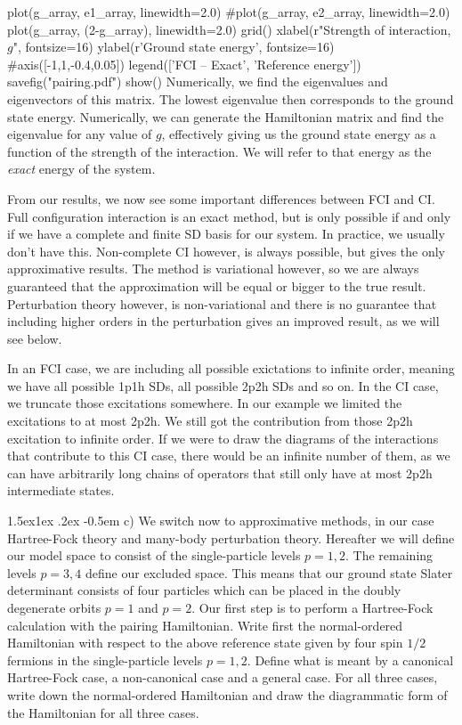 \documentclass[%
twoside,                 %
final,                   %
10pt]{article}
\makeatletter
\newenvironment{doconceexercise}{}{}
\newcommand\subex{\@startsection{paragraph}{4}{\z@}%
                  {1.5ex\@plus1ex \@minus.2ex}%
                  {-0.5em}%
                  {\normalfont\normalsize\bfseries}}
\makeatother
\begin{document}
\begin{doconceexercise}
plot(g_array, e1_array, linewidth=2.0)
#plot(g_array, e2_array, linewidth=2.0)
plot(g_array, (2-g_array), linewidth=2.0)
grid()
xlabel(r"Strength of interaction, $g$", fontsize=16)
ylabel(r'Ground state energy', fontsize=16)
#axis([-1,1,-0.4,0.05])
legend(['FCI -- Exact', 'Reference energy'])
savefig("pairing.pdf")
show()
\epypro
Numerically, we find the eigenvalues and eigenvectors of this
matrix. The lowest eigenvalue then corresponds to the ground state
energy. Numerically, we can generate the Hamiltonian matrix and find
the eigenvalue for any value of $g$, effectively giving us the ground
state energy as a function of the strength of the interaction. We will
refer to that energy as the \emph{exact} energy of the system. 

From our results, we now see some important differences between FCI
and CI. Full configuration interaction is an exact method, but is only
possible if and only if we have a complete and finite SD basis for our
system. In practice, we usually don't have this. Non-complete
CI however, is always possible, but gives the only  approximative
results. The method is variational however, so we are always
guaranteed that the approximation will be equal or bigger to the true
result. 
Perturbation theory however, is non-variational and there is no guarantee that including higher orders in the 
perturbation gives an improved result, as we will see below.

In an FCI case, we are including all possible exictations to infinite
order, meaning we have all possible 1p1h SDs, all possible 2p2h SDs
and so on. In the CI case, we truncate those excitations somewhere. In
our example we limited the excitations to at most 2p2h. We still got
the contribution from those 2p2h excitation to infinite order. If we
were to draw the diagrams of the interactions that contribute to this
CI case, there would be an infinite number of them, as we can have
arbitrarily long chains of operators that still only have at most 2p2h
intermediate states.


\subex{c)}
We switch now to approximative methods, in our case Hartree-Fock
  theory and many-body perturbation theory. Hereafter we will define
  our model space to consist of the single-particle levels $p=1,2$.
  The remaining levels $p=3,4$ define our excluded space.  This means
  that our ground state Slater determinant consists of four particles
  which can be placed in the doubly degenerate orbits $p=1$ and $p=2$.
  Our first step is to perform a Hartree-Fock calculation with the
  pairing Hamiltonian.  Write first the normal-ordered Hamiltonian
  with respect to the above reference state given by four spin $1/2$
  fermions in the single-particle levels $p=1,2$. Define what is meant
  by a canonical Hartree-Fock case, a non-canonical case and a general
  case.  For all three cases, write down the normal-ordered
  Hamiltonian and draw the diagrammatic form of the Hamiltonian for all three cases.




\end{doconceexercise}
\end{document}
